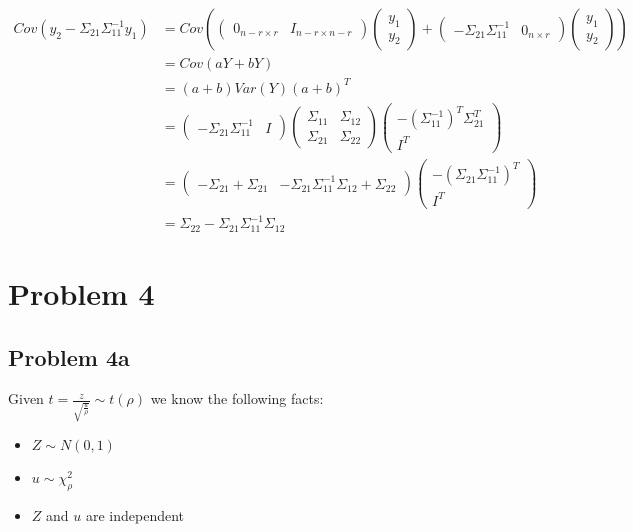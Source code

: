 \documentclass[a4paper]{article}
\begin{document}
\begin{align*}
Cov(y_2 - \Sigma_{21}\Sigma_{11}^{-1}y_1 ) &= Cov(\begin{pmatrix} 0_{n-r \times r} & I_{n-r \times n-r} \end{pmatrix} \begin{pmatrix}y_1 \\ y_2\end{pmatrix} + \begin{pmatrix} -\Sigma_{21}\Sigma_{11}^{-1} & 0_{n \times r}\end{pmatrix}\begin{pmatrix}y_1 \\ y_2\end{pmatrix})\\
&= Cov(aY+bY)\\
&= (a+b)Var(Y)(a+b)^T\\
&= \begin{pmatrix} -\Sigma_{21}\Sigma_{11}^{-1} & I \end{pmatrix} \begin{pmatrix} 
\Sigma_{11} & \Sigma_{12}\\
\Sigma_{21} & \Sigma_{22}
\end{pmatrix}\begin{pmatrix} -(\Sigma_{11}^{-1})^T\Sigma_{21}^T \\ I^T \end{pmatrix}\\
&= \begin{pmatrix}-\Sigma_{21}+\Sigma_{21} & -\Sigma_{21}\Sigma_{11}^{-1}\Sigma_{12}+\Sigma_{22} \end{pmatrix} \begin{pmatrix}-(\Sigma_{21}\Sigma_{11}^{-1})^T \\ I^T\end{pmatrix}\\
&= \Sigma_{22}-\Sigma_{21}\Sigma_{11}^{-1}\Sigma_{12}
\end{align*} 


\section*{Problem 4}
\subsection*{Problem 4a}

Given $t=\frac{z}{\sqrt{\frac{u}{\rho}}} \sim t(\rho)$ we know the following facts:

\begin{itemize}
\item $Z \sim N(0,1)$
\item $u \sim \chi^2_\rho$
\item $Z$ and $u$ are independent
\end{itemize}
\end{document}

